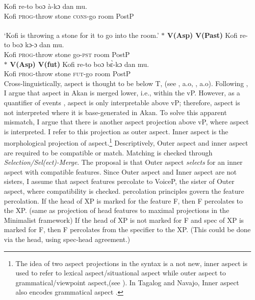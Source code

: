 \documentclass[output=paper,colorlinks,citecolor=brown]{langscibook}
\begin{document}
\ea\label{ex041} 
\gll Kofi re-to boɔ \`a-kɔ dan mu.\\
	Kofi \textsc{prog}-throw stone \textsc{cons}-go room PostP\\
	 \\
\glt `Kofi is throwing a stone for it to go into the room.'
\z 
\ex\label{ex051}
\textbf{$\ast$ \phantom {} {} {}  V(Asp)\phantom {} {} {}   V(Past)} 
     \ea\label{ex7} 
\gll * Kofi re-to boɔ kɔ-ɔ dan mu.\\
	{} Kofi \textsc{prog}-throw  stone  go-\textsc{pst} room PostP\\
\z 
\ex\label{ex061}
\textbf{$\ast$ \phantom {} {} {}  V(Asp)\phantom {} {} {}   V(fut)} 
     \ea\label{ex1} 
\gll * Kofi re-to boɔ  b\`{ɛ}-kɔ dan mu.\\
	{} Kofi \textsc{prog}-throw stone  \textsc{fut}-go room PostP\\

\z 
\z \z Cross-linguistically, aspect is thought to be below T, (see \citet{Rizzi2004} \citet{Rizzi2013Notes}, a.o, \citet{Cinque2002, Cinque2006}, \citet{RizziCinque2016} \citet{CinqueRizzi2010} a.o). Following \citet{Kandybowicz2010, Kandybowicz2015}, I argue that aspect in Akan is merged lower, i.e., within the vP.  However, as a quantifier of events \citep{Hacquard2006}, aspect is only interpretable above vP; therefore, aspect is not interpreted where it is base-generated in Akan. To solve this apparent mismatch, I argue that there is another aspect projection above vP, where aspect is interpreted. I refer to this projection as outer aspect. Inner aspect is the morphological projection of aspect.\footnote{The idea of two aspect projections in the syntax is a not new, inner aspect is used to refer to lexical aspect/situational aspect while outer aspect to grammatical/viewpoint aspect,(see \citealt{Travis2010, Travis1991, Smith1991, MacDonald2006}). In Tagalog and Navajo, Inner aspect also encodes grammatical aspect \citep{Travis2010}.} Descriptively, Outer aspect and inner aspect are required to be compatible or match. Matching is checked through \textit{Selection/Sel(ect)-Merge}. The proposal is that Outer aspect \textit{selects} for an inner aspect with compatible features. Since Outer aspect and Inner aspect are not sisters, 
I assume that aspect features percolate to VoiceP, the sister of Outer aspect, where compatibility is checked.  percolation principles govern the feature percolation. \nocite{Webelhuth1992}
\ea \label{ex16}
\ea If the head of XP is marked for the feature F, then F percolates to the XP. (same as projection of head features to maximal projections in the Minimalist framework)
\ex If the head of XP is not marked for F and spec of XP is marked for F, then F percolates from the specifier to the XP. (This could be done via the head, using spec-head agreement.)
\end{document}

